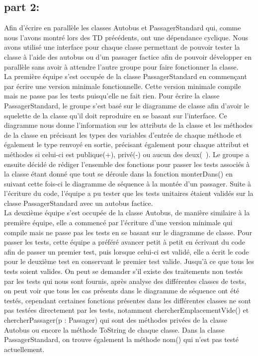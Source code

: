 \documentclass{article}
\begin{document}
\subsection{part 2: }
Afin d’écrire en parallèle les classes Autobus et PassagerStandard qui, comme nous
l’avons montré lors des TD précédents, ont une dépendance cyclique. Nous avons utilisé
une interface pour chaque classe permettant de pouvoir tester la classe à l’aide des autobus ou d’un passager factice afin de pouvoir développer en parallèle sans avoir à attendre l’autre groupe pour faire fonctionner la classe.\\
La première équipe s’est occupée de la classe PassagerStandard en commençant par écrire une version minimale fonctionnelle. Cette version minimale compile mais ne passe pas les tests puisqu’elle ne fait rien. Pour écrire la classe PassagerStandard, le groupe s’est basé sur le diagramme de classe afin d’avoir le squelette de la classe qu’il doit reproduire en se basant sur l’interface. Ce diagramme nous donne l’information sur les attributs de la classe et les méthodes de la classe en précisant les types des variables d’entrée de chaque méthode et également le type renvoyé en sortie, précisant également pour chaque attribut et méthodes si celui-ci est publique(+), privé(-) ou aucun des deux(~). Le groupe a ensuite décidé de rédiger l’ensemble des fonctions pour
passer les tests associés à la classe étant donné que tout se déroule dans la fonction
monterDans() en suivant cette fois-ci le diagramme de séquence à la montée d’un
passager. Suite à l’écriture du code, l’équipe a pu tester que les tests unitaires étaient validés sur la classe PassagerStandard avec un autobus factice.\\

La deuxième équipe s’est occupée de la classe Autobus, de manière similaire à la
première équipe, elle a commencé par l’écriture d’une version minimale qui compile mais ne passe pas les tests en se basant sur le diagramme de classe. Pour passer les tests, cette équipe a préféré avancer petit à petit en écrivant du code afin de passer un premier test, puis lorsque celui-ci est validé, elle a écrit le code pour le deuxième test en conservant le premier test valide. Jusqu’à ce que tous les tests soient valides.
On peut se demander s’il existe des traitements non testés par les tests qui nous sont
fournis, après analyse des différentes classes de tests, on peut voir que tous les cas
présents dans le diagramme de séquence ont été testés, cependant certaines fonctions
présentes dans les différentes classes ne sont pas testées directement par les tests,
notamment chercherEmplacementVide() et chercherPassager(p : Passager) qui
sont des méthodes privées de la classe Autobus ou encore la méthode ToString de
chaque classe. Dans la classe PassagerStandard, on trouve également la méthode
nom() qui n’est pas testé actuellement.\\
\end{document}
